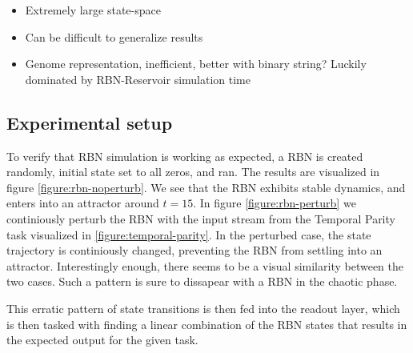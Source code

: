 \begin{itemize}
  \item Extremely large state-space
  \item Can be difficult to generalize results
  \item
    Genome representation, inefficient, better with binary string?
    Luckily dominated by RBN-Reservoir simulation time
\end{itemize}


\subsection{Experimental setup}

To verify that RBN simulation is working as expected,
a RBN is created randomly, initial state set to all zeros, and ran.
The results are visualized in figure \ref{figure:rbn-noperturb}.
We see that the RBN exhibits stable dynamics, and enters into an attractor around $t=15$.
In figure \ref{figure:rbn-perturb} we continiously perturb the RBN with the input stream from the Temporal Parity task visualized in \ref{figure:temporal-parity}.
In the perturbed case, the state trajectory is continiously changed, preventing the RBN from settling into an attractor.
Interestingly enough, there seems to be a visual similarity between the two cases.
Such a pattern is sure to dissapear with a RBN in the chaotic phase.

This erratic pattern of state transitions is then fed into the readout layer,
which is then tasked with finding a linear combination of the RBN states that results in the expected output for the given task.

